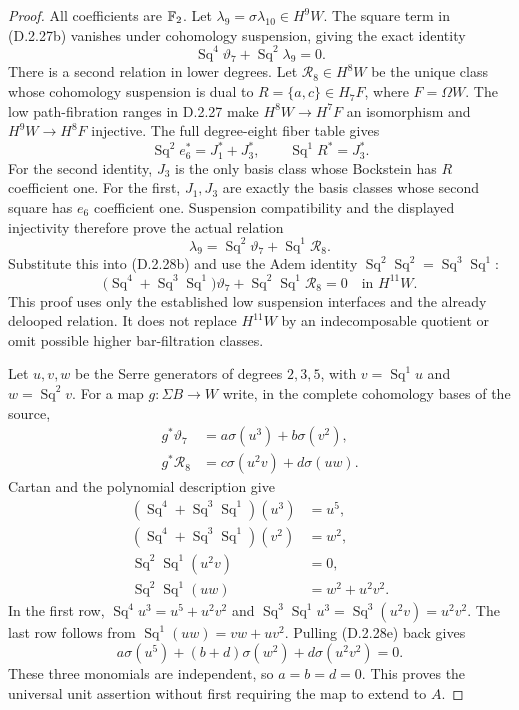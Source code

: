 \begin{proof}
All coefficients are $\mathbb F_2$. Let
$\lambda_9=\sigma\lambda_{10}\in H^9W$.
The square term in \textup{(D.2.27b)} vanishes under
cohomology suspension, giving the exact identity
\[
 \operatorname{Sq}^4\vartheta_7+
       \operatorname{Sq}^2\lambda_9=0.
 \tag{D.2.28b}
\]
There is a second relation in lower degrees.
Let $\mathcal R_8\in H^8W$ be the unique class whose
cohomology suspension is dual to
$R=\{a,c\}\in H_7F$, where $F=\Omega W$.
The low path-fibration ranges in \textup{D.2.27} make
$H^8W\to H^7F$ an isomorphism and
$H^9W\to H^8F$ injective.
The full degree-eight fiber table gives
\[
 \operatorname{Sq}^2e_6^*=J_1^*+J_3^*,
 \qquad \operatorname{Sq}^1R^*=J_3^*.
 \tag{D.2.28c}
\]
For the second identity, $J_3$ is the only basis class
whose Bockstein has $R$ coefficient one.
For the first, $J_1,J_3$ are exactly the basis classes
whose second square has $e_6$ coefficient one.
Suspension compatibility and the displayed injectivity
therefore prove the actual relation
\[
 \lambda_9=\operatorname{Sq}^2\vartheta_7+
               \operatorname{Sq}^1\mathcal R_8.
 \tag{D.2.28d}
\]
Substitute this into \textup{(D.2.28b)} and use the Adem
identity $\operatorname{Sq}^2\operatorname{Sq}^2
=\operatorname{Sq}^3\operatorname{Sq}^1$:
\[
 \bigl(\operatorname{Sq}^4+
       \operatorname{Sq}^3\operatorname{Sq}^1\bigr)
       \vartheta_7
       +\operatorname{Sq}^2\operatorname{Sq}^1
          \mathcal R_8=0\quad\text{in }H^{11}W.
 \tag{D.2.28e}
\]
This proof uses only the established low suspension
interfaces and the already delooped relation. It does not
replace $H^{11}W$ by an indecomposable quotient or omit
possible higher bar-filtration classes.

Let $u,v,w$ be the Serre generators of degrees $2,3,5$,
with $v=\operatorname{Sq}^1u$ and
$w=\operatorname{Sq}^2v$.
For a map $g:\Sigma B\to W$ write, in the complete
cohomology bases of the source,
\[
 \begin{split}
 g^*\vartheta_7&=a\sigma(u^3)+b\sigma(v^2),\\
 g^*\mathcal R_8&=c\sigma(u^2v)+d\sigma(uw).
 \end{split}
 \tag{D.2.28f}
\]
Cartan and the polynomial description
\cite[\S2, nos.~8--9]{I_Serre1953} give
\[
\begin{aligned}
 (\operatorname{Sq}^4+\operatorname{Sq}^3
                  \operatorname{Sq}^1)(u^3)&=u^5,\\
 (\operatorname{Sq}^4+\operatorname{Sq}^3
                  \operatorname{Sq}^1)(v^2)&=w^2,\\
 \operatorname{Sq}^2\operatorname{Sq}^1(u^2v)&=0,\\
 \operatorname{Sq}^2\operatorname{Sq}^1(uw)&=w^2+u^2v^2.
\end{aligned}
 \tag{D.2.28g}
\]
In the first row,
$\operatorname{Sq}^4u^3=u^5+u^2v^2$ and
$\operatorname{Sq}^3\operatorname{Sq}^1u^3
=\operatorname{Sq}^3(u^2v)=u^2v^2$.
The last row follows from
$\operatorname{Sq}^1(uw)=vw+uv^2$.
Pulling \textup{(D.2.28e)} back gives
\[
 a\sigma(u^5)+(b+d)\sigma(w^2)
       +d\sigma(u^2v^2)=0.
 \tag{D.2.28h}
\]
These three monomials are independent, so $a=b=d=0$.
This proves the universal unit assertion without first
requiring the map to extend to $A$.


\end{proof}
